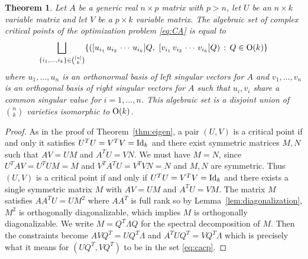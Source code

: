 \documentclass[12pt]{extarticle}
\newtheorem{theorem}{Theorem}
\theoremstyle{definition}
\numberwithin{theorem}{section}
\begin{document}
\begin{theorem}\label{thm:svd}
  Let $A$ be a generic real $n \times p$ matrix with $p>n$, let $U$ be an $n \times k$ variable matrix and let $V$ be a $p \times k$ variable matrix. 
  The algebraic set of complex critical points of the optimization problem \eqref{eq:CA} 
  is equal to 
    \begin{align}\label{eq:cacp}
     \bigsqcup_{\{i_1, \ldots, i_k\} \in \binom{[n]}{k}} \{([u_{i_1} \, u_{i_2} \, \cdots \, u_{i_k}] Q,\,\, [v_{i_1} \, v_{i_2} \, \cdots \, v_{i_k}] Q) \, : \, Q \in {\rm O}(k)\} 
  \end{align}
  where $u_1, \ldots, u_n$ is an orthonormal basis of left singular vectors for $A$ and $v_1, \ldots, v_n$ is an orthogonal basis of right singular vectors for $A$ such that $u_i, v_i$ share a common singular value for $i =1, \ldots, n$. 
  This algebraic set is a disjoint union of $\binom{n}{k}$ 
  varieties isomorphic to ${\rm O}(k)$.
\end{theorem}
\begin{proof}
As in the proof of Theorem~\ref{thm:eigen}, a pair $(U, V)$ is a critical point if and only it satisfies $U^TU = V^TV = {\rm Id}_k$ and there exist symmetric matrices $M, N$ such that $AV = UM$ and $A^TU = VN$. 
We must have $M = N$, since $U^TAV = U^TUM = M$ and $V^TA^TU = V^TVN = N$ and $M, N$ are symmetric. 
Thus $(U,V)$ is a critical point if and only if $U^TU = V^TV = {\rm Id}_k$ and there exists a single symmetric matrix $M$ with $AV = UM$ and $A^TU = VM$. 
The matrix $M$ satisfies $AA^TU = UM^2$ where $AA^T$ is full rank so by Lemma~\ref{lem:diagonalization}, $M^2$ is orthogonally diagonalizable, which implies $M$ is orthogonally 
diagonalizable.
We write $M = Q^T \Lambda Q$ for the spectral decomposition of $M$. 
Then the constraints become $AVQ^T = UQ^T \Lambda$ and $A^TUQ^T = VQ^T\Lambda$ which is precisely what it means for $(UQ^T, VQ^T)$ to be in the set \eqref{eq:cacp}.
\end{proof}
\end{document}
